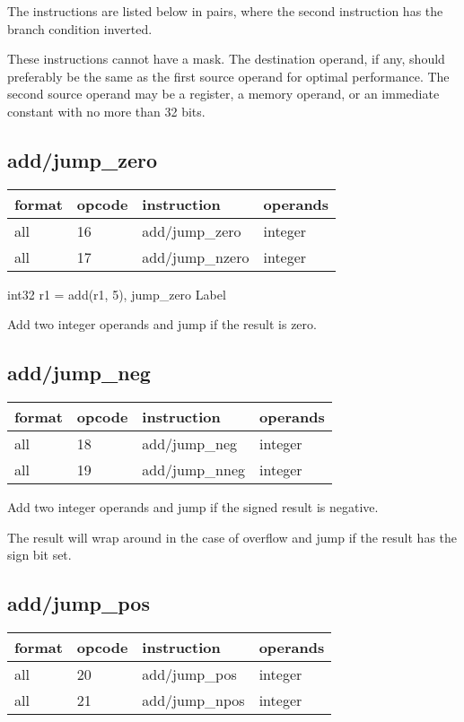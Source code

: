 \documentclass[forwardcom.tex]{subfiles}
\begin{document}
The instructions are listed below in pairs, where the second instruction has the branch condition inverted. 
\vv

These instructions cannot have a mask. 
The destination operand, if any, should preferably be the same as the first source operand for optimal performance. The second source operand may be a register, a memory operand, or an immediate constant with no more than 32 bits.
\vv


\subsection{add/jump\_zero}
\label{table:addJumpZeroInstruction}
\begin{tabular}{|p{16mm}|p{12mm}|p{60mm}|p{50mm}|}
\hline
\bfseries format & \bfseries opcode & \bfseries instruction & \bfseries operands \\ \hline
all & 16 & add/jump\_zero & integer \\ \hline
all & 17 & add/jump\_nzero & integer\\ \hline
\end{tabular}
\vv

int32 r1 = add(r1, 5), jump\_zero Label
\vv

Add two integer operands and jump if the result is zero.
\vv

\subsection{add/jump\_neg}
\label{table:addJumpNegInstruction}
\begin{tabular}{|p{16mm}|p{12mm}|p{60mm}|p{50mm}|}
\hline
\bfseries format & \bfseries opcode & \bfseries instruction & \bfseries operands \\ \hline
all & 18 & add/jump\_neg & integer \\ \hline
all & 19 & add/jump\_nneg & integer\\ \hline
\end{tabular}
\vv

Add two integer operands and jump if the signed result is negative.

The result will wrap around in the case of overflow and jump if the result has the sign bit set.


\subsection{add/jump\_pos}
\label{table:addJumpPosInstruction}
\begin{tabular}{|p{16mm}|p{12mm}|p{60mm}|p{50mm}|}
\hline
\bfseries format & \bfseries opcode & \bfseries instruction & \bfseries operands \\ \hline
all & 20 & add/jump\_pos & integer \\ \hline
all & 21 & add/jump\_npos & integer\\ \hline
\end{tabular}
\vv
\end{document}
